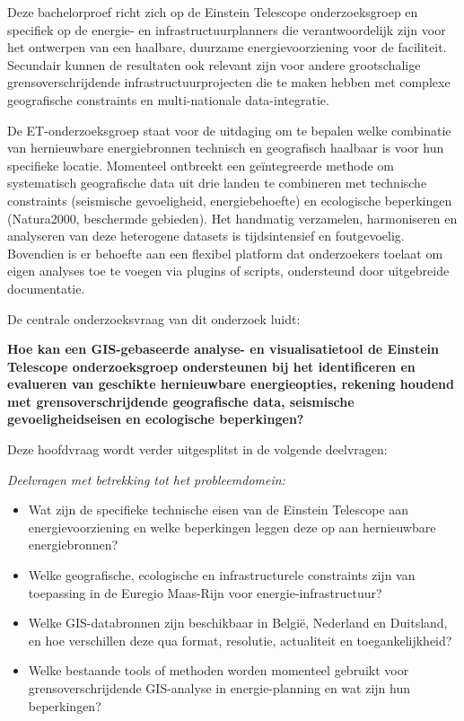 Deze bachelorproef richt zich op de Einstein Telescope onderzoeksgroep en specifiek op de energie- en infrastructuurplanners die verantwoordelijk zijn voor het ontwerpen van een haalbare, duurzame energievoorziening voor de faciliteit. Secundair kunnen de resultaten ook relevant zijn voor andere grootschalige grensoverschrijdende infrastructuurprojecten die te maken hebben met complexe geografische constraints en multi-nationale data-integratie.

De ET-onderzoeksgroep staat voor de uitdaging om te bepalen welke combinatie van hernieuwbare energiebronnen technisch en geografisch haalbaar is voor hun specifieke locatie. Momenteel ontbreekt een geïntegreerde methode om systematisch geografische data uit drie landen te combineren met technische constraints (seismische gevoeligheid, energiebehoefte) en ecologische beperkingen (Natura2000, beschermde gebieden). Het handmatig verzamelen, harmoniseren en analyseren van deze heterogene datasets is tijdsintensief en foutgevoelig. Bovendien is er behoefte aan een flexibel platform dat onderzoekers toelaat om eigen analyses toe te voegen via plugins of scripts, ondersteund door uitgebreide documentatie.

De centrale onderzoeksvraag van dit onderzoek luidt: 

\textbf{Hoe kan een GIS-\-gebaseerde analyse- en visualisatietool de Einstein Telescope onderzoeksgroep ondersteunen bij het identificeren en evalueren van geschikte hernieuwbare energieopties, rekening houdend met grensoverschrijdende geografische data, seismische gevoeligheidseisen en ecologische beperkingen?}

Deze hoofdvraag wordt verder uitgesplitst in de volgende deelvragen:

\textit{Deelvragen met betrekking tot het probleemdomein:}
\begin{itemize}
    \item Wat zijn de specifieke technische eisen van de Einstein Telescope aan energievoorziening en welke beperkingen leggen deze op aan hernieuwbare energiebronnen?
    \item Welke geografische, ecologische en infrastructurele constraints zijn van toepassing in de Euregio Maas-\-Rijn voor energie-\-infrastructuur?
    \item Welke GIS-\-databronnen zijn beschikbaar in België, Nederland en Duitsland, en hoe verschillen deze qua format, resolutie, actualiteit en toegankelijkheid?
    \item Welke bestaande tools of methoden worden momenteel gebruikt voor grensoverschrijdende GIS-\-analyse in energie-\-planning en wat zijn hun beperkingen?
\end{itemize}

